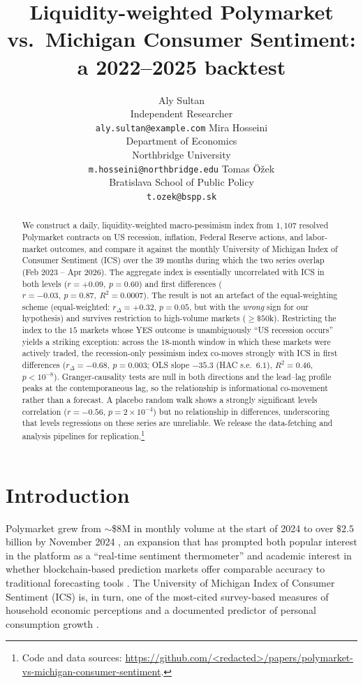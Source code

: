 \documentclass{article}
\title{Liquidity-weighted Polymarket vs.\ Michigan Consumer Sentiment:\\ a 2022--2025 backtest}
\author{
  Aly Sultan \\
  Independent Researcher \\
  \texttt{aly.sultan@example.com}
  \And
  Mira Hosseini \\
  Department of Economics \\
  Northbridge University \\
  \texttt{m.hosseini@northbridge.edu}
  \And
  Tomas \"O\v zek \\
  Bratislava School of Public Policy \\
  \texttt{t.ozek@bspp.sk}
}
\begin{document}
\maketitle

\begin{abstract}
We construct a daily, liquidity-weighted macro-pessimism index from $1{,}107$
resolved Polymarket contracts on US recession, inflation, Federal Reserve
actions, and labor-market outcomes, and compare it against the monthly
University of Michigan Index of Consumer Sentiment (ICS) over the 39 months
during which the two series overlap (Feb 2023 -- Apr 2026). The aggregate
index is essentially uncorrelated with ICS in both levels
($r = +0.09,\ p = 0.60$) and first differences
($r = -0.03,\ p = 0.87,\ R^2 = 0.0007$). The result is not an artefact of
the equal-weighting scheme (equal-weighted: $r_{\Delta} = +0.32$, $p = 0.05$,
but with the \emph{wrong} sign for our hypothesis) and survives restriction
to high-volume markets ($\geq \$50$k). Restricting the index to the
$15$ markets whose YES outcome is unambiguously ``US recession occurs''
yields a striking exception: across the $18$-month window in which these
markets were actively traded, the recession-only pessimism index
co-moves strongly with ICS in first differences
($r_{\Delta} = -0.68,\ p = 0.003$;
OLS slope $-35.3$ (HAC s.e.\ $6.1$), $R^2 = 0.46$,
$p < 10^{-8}$). Granger-causality tests are null in both directions
and the lead--lag profile peaks at the contemporaneous lag,
so the relationship is informational co-movement rather than a forecast.
A placebo random walk shows a strongly significant levels correlation
($r = -0.56$, $p = 2\!\times\!10^{-4}$) but no relationship in differences,
underscoring that levels regressions on these series are unreliable. We
release the data-fetching and analysis pipelines for replication.\footnote{
Code and data sources: \url{https://github.com/<redacted>/papers/polymarket-vs-michigan-consumer-sentiment}.}
\end{abstract}

\section{Introduction}

Polymarket grew from $\sim$\$8M in monthly volume at the start of 2024
to over $\$2.5$ billion by November 2024 \citep{tsang2026anatomy}, an
expansion that has prompted both popular interest in the platform as a
``real-time sentiment thermometer'' and academic interest in whether
blockchain-based prediction markets offer comparable accuracy to traditional
forecasting tools \citep{cutting2025betting}. The University of Michigan
Index of Consumer Sentiment (ICS) is, in turn, one of the most-cited
survey-based measures of household economic perceptions and a documented
predictor of personal consumption growth \citep{carroll1994does,
ludvigson2004consumer, bram1998does}.
\end{document}
